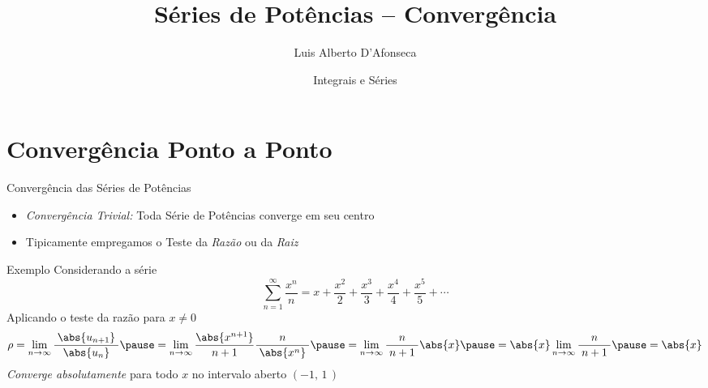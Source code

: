 
\usepackage{apresentacao}
\usepackage{mathconfig}
\usepackage{tabto}

\makeatletter
\graphicspath  {{./figs/}}
\makeatother

\setcounter{exemplo}{0}

\title {Séries de Potências -- Convergência}
\author{\large Luis Alberto D'Afonseca}
\date  {Integrais e Séries}



\begin{frame}
    \titlepage
\end{frame}

\section{Convergência Ponto a Ponto}

\begin{frame}{Convergência das Séries de Potências}
  \begin{itemize}[<+->]
    \item \emph{Convergência Trivial:} Toda Série de Potências converge em seu centro\\[5mm]
    \item Tipicamente empregamos o Teste da \emph{Razão} ou da \emph{Raiz}
  \end{itemize}
\end{frame}

\addtocounter{exemplo}{1}
\begin{frame}{Exemplo \theexemplo}
  Considerando a série
  \[
    \sum_{n=1}^{\infty} \frac{x^n}{n}
    = x + \frac{x^2}{2}
        + \frac{x^3}{3}
        + \frac{x^4}{4}
        + \frac{x^5}{5}
        + \cdots
  \]
  \pause
  Aplicando o teste da razão para $x\neq 0$
  \[
    \rho   = \lim_{n\to\infty} \frac{\;\abs{u_{n+1}}\;}{\abs{u_n}}
    \pause = \lim_{n\to\infty} \frac{\abs{x^{n+1}}}{\;n+1\;} \frac{n}{\;\abs{x^n}\;}
    \pause = \lim_{n\to\infty} \frac{n}{\;n+1\;} \abs{x}
    \pause = \abs{x} \lim_{n\to\infty} \frac{n}{\;n+1\;}
    \pause = \abs{x}
  \]
  \pause
  \emph{Converge absolutamente} para todo $x$ no intervalo aberto $(-1,\,1\,)$
\end{frame}

